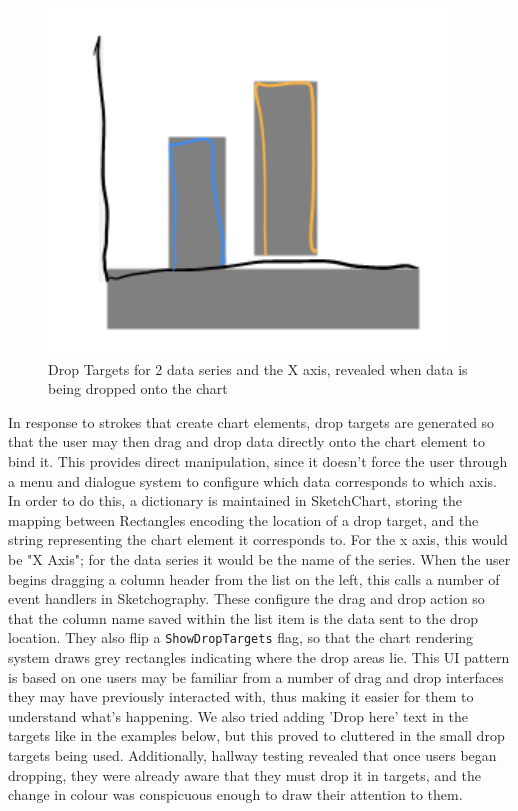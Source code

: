 	\begin{figure}[h]
	\includegraphics[scale=1]{droptargets}
	\caption{Drop Targets for 2 data series and the X axis, revealed when data is being dropped onto the chart}
	\end{figure}
	
	In response to strokes that create chart elements, drop targets are generated so that the user may then drag and drop data directly onto the chart element to bind it. This provides direct manipulation, since it doesn't force the user through a menu and dialogue system to configure which data corresponds to which axis. In order to do this, a dictionary is maintained in SketchChart, storing the mapping between Rectangles encoding the location of a drop target, and the string representing the chart element it corresponds to. For the x axis, this would be "X Axis"; for the data series it would be the name of the series. When the user begins dragging a column header from the list on the left, this calls a number of event handlers in Sketchography. These configure the drag and drop action so that the column name saved within the list item is the data sent to the drop location. They also flip a \texttt{ShowDropTargets} flag, so that the chart rendering system draws grey rectangles indicating where the drop areas lie. This UI pattern is based on one users may be familiar from a number of drag and drop interfaces they may have previously interacted with, thus making it easier for them to understand what's happening. We also tried adding 'Drop here' text in the targets like in the examples below, but this proved to cluttered in the small drop targets being used. Additionally, hallway testing revealed that once users began dropping, they were already aware that they must drop it in targets, and the change in colour was conspicuous enough to draw their attention to them.
	
